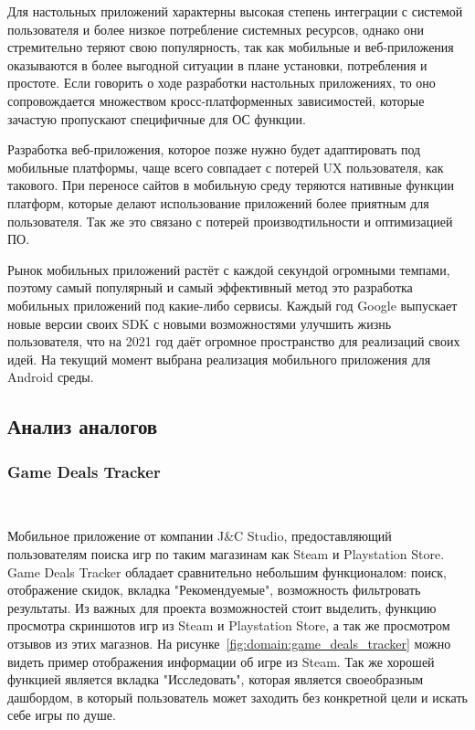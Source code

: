 Для настольных приложений характерны высокая степень интеграции с системой пользователя и более низкое потребление системных ресурсов, однако они стремительно теряют свою популярность, так как мобильные и веб-приложения оказываются в более выгодной ситуации в плане установки, потребления и простоте. Если говорить о ходе разработки настольных приложениях, то оно сопровождается множеством кросс-платформенных зависимостей, которые зачастую пропускают специфичные для ОС функции.

Разработка веб-приложения, которое позже нужно будет адаптировать под мобильные платформы, чаще всего совпадает с потерей UX пользователя, как такового. При переносе сайтов в мобильную среду теряются нативные функции платформ, которые делают использование приложений более приятным для пользователя. Так же это связано с потерей производтильности и оптимизацией ПО.

Рынок мобильных приложений растёт с каждой секундой огромными темпами, поэтому самый популярный и самый эффективный метод это разработка мобильных приложений под какие-либо сервисы. Каждый год Google выпускает новые версии своих SDK с новыми возможностями улучшить жизнь пользователя, что на 2021 год даёт огромное пространство для реализаций своих идей. На текущий момент выбрана реализация мобильного приложения для Android среды.

\subsection{Анализ аналогов}

\subsubsection{Game Deals Tracker}~\par
Мобильное приложение от компании J\&C Studio, предоставляющий пользователям поиска игр по таким магазинам как Steam и Playstation Store. Game Deals Tracker обладает сравнительно небольшим функционалом: поиск, отображение скидок, вкладка "Рекомендуемые", возможность фильтровать результаты. Из важных для проекта возможностей стоит выделить, функцию просмотра скриншотов игр из Steam и Playstation Store, а так же просмотром отзывов из этих магазнов. На рисунке~\ref{fig:domain:game_deals_tracker} можно видеть пример отображения информации об игре из Steam. Так же хорошей функцией является вкладка "Исследовать", которая является своеобразным дашбордом, в который пользователь может заходить без конкретной цели и искать себе игры по душе.
 
